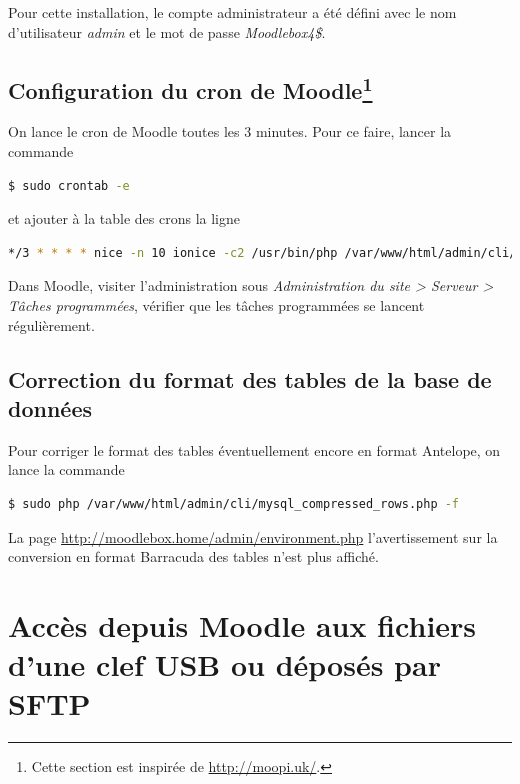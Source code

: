 \documentclass[11pt]{article}
\begin{document}
Pour cette installation, le compte administrateur a été défini avec le nom d'utilisateur \emph{admin} et le mot de passe \emph{Moodlebox4\$}.

\subsection[Configuration du cron de Moodle]{Configuration du cron de Moodle\footnote{Cette section est inspirée de \url{http://moopi.uk/}.}}

On lance le cron de Moodle toutes les 3 minutes. Pour ce faire, lancer la commande

\begin{lstlisting}[language=bash]
$ sudo crontab -e
\end{lstlisting}

et ajouter à la table des crons la ligne
\begin{lstlisting}[language=bash]
*/3 * * * * nice -n 10 ionice -c2 /usr/bin/php /var/www/html/admin/cli/cron.php
\end{lstlisting}

\begin{verification}
Dans Moodle, visiter l'administration sous \emph{Administration du site > Serveur > Tâches programmées}, vérifier que les tâches programmées se lancent régulièrement.
\end{verification}

\subsection{Correction du format des tables de la base de données}

Pour corriger le format des tables éventuellement encore en format Antelope, on lance la commande

\begin{lstlisting}[language=bash]
$ sudo php /var/www/html/admin/cli/mysql_compressed_rows.php -f
\end{lstlisting}

\begin{verification}
La page \url{http://moodlebox.home/admin/environment.php} l'avertissement sur la conversion en format Barracuda des tables n'est plus affiché.
\end{verification}

\section{Accès depuis Moodle aux fichiers d'une clef USB ou déposés par SFTP}
\end{document}
